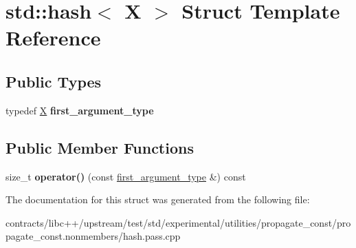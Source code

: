 \hypertarget{structstd_1_1hash_3_01_x_01_4}{}\section{std\+:\+:hash$<$ X $>$ Struct Template Reference}
\label{structstd_1_1hash_3_01_x_01_4}
\subsection*{Public Types}
\begin{DoxyCompactItemize}
\item 
\mbox{\label{structstd_1_1hash_3_01_x_01_4_a80b5428791776cd6d03f53e7fddf6cf5}} 
typedef \mbox{\hyperlink{class_x}{X}} {\bfseries first\+\_\+argument\+\_\+type}
\end{DoxyCompactItemize}
\subsection*{Public Member Functions}
\begin{DoxyCompactItemize}
\item 
\mbox{\label{structstd_1_1hash_3_01_x_01_4_a3f45b79193445c7bf4f7c7c37fc5d7b5}} 
size\+\_\+t {\bfseries operator()} (const \mbox{\hyperlink{class_x}{first\+\_\+argument\+\_\+type}} \&) const
\end{DoxyCompactItemize}


The documentation for this struct was generated from the following file\+:\begin{DoxyCompactItemize}
\item 
contracts/libc++/upstream/test/std/experimental/utilities/propagate\+\_\+const/propagate\+\_\+const.\+nonmembers/hash.\+pass.\+cpp\end{DoxyCompactItemize}
